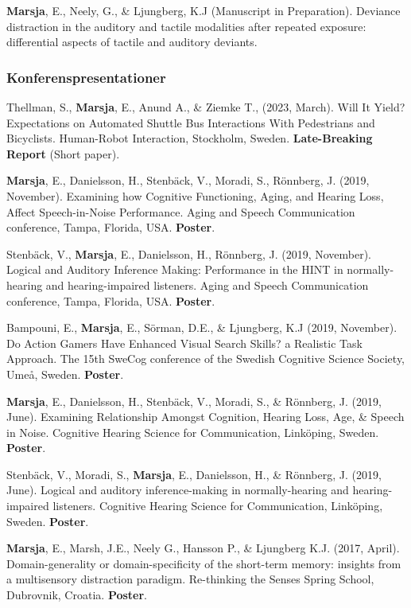 \documentclass[]{article}
\begin{document}
\textbf{Marsja}, E., Neely, G., \& Ljungberg, K.J (Manuscript in
Preparation). Deviance distraction in the auditory and tactile
modalities after repeated exposure: differential aspects of tactile and
auditory deviants.

\hypertarget{konferenspresentationer}{%
\subsubsection{Konferenspresentationer}\label{konferenspresentationer}}

Thellman, S., \textbf{Marsja}, E., Anund A., \& Ziemke T., (2023,
March). Will It Yield? Expectations on Automated Shuttle Bus
Interactions With Pedestrians and Bicyclists. Human-Robot Interaction,
Stockholm, Sweden. \textbf{Late-Breaking Report} (Short paper).

\textbf{Marsja}, E., Danielsson, H., Stenbäck, V., Moradi, S., Rönnberg,
J. (2019, November). Examining how Cognitive Functioning, Aging, and
Hearing Loss, Affect Speech-in-Noise Performance. Aging and Speech
Communication conference, Tampa, Florida, USA. \textbf{Poster}.

Stenbäck, V., \textbf{Marsja}, E., Danielsson, H., Rönnberg, J. (2019,
November). Logical and Auditory Inference Making: Performance in the
HINT in normally-hearing and hearing-impaired listeners. Aging and
Speech Communication conference, Tampa, Florida, USA. \textbf{Poster}.

Bampouni, E., \textbf{Marsja}, E., Sörman, D.E., \& Ljungberg, K.J
(2019, November). Do Action Gamers Have Enhanced Visual Search Skills? a
Realistic Task Approach. The 15th SweCog conference of the Swedish
Cognitive Science Society, Umeå, Sweden. \textbf{Poster}.

\textbf{Marsja}, E., Danielsson, H., Stenbäck, V., Moradi, S., \&
Rönnberg, J. (2019, June). Examining Relationship Amongst Cognition,
Hearing Loss, Age, \& Speech in Noise. Cognitive Hearing Science for
Communication, Linköping, Sweden. \textbf{Poster}.

Stenbäck, V., Moradi, S., \textbf{Marsja}, E., Danielsson, H., \&
Rönnberg, J. (2019, June). Logical and auditory inference-making in
normally-hearing and hearing-impaired listeners. Cognitive Hearing
Science for Communication, Linköping, Sweden. \textbf{Poster}.

\textbf{Marsja}, E., Marsh, J.E., Neely G., Hansson P., \& Ljungberg
K.J. (2017, April). Domain-generality or domain-specificity of the
short-term memory: insights from a multisensory distraction paradigm.
Re-thinking the Senses Spring School, Dubrovnik, Croatia.
\textbf{Poster}.
\end{document}
